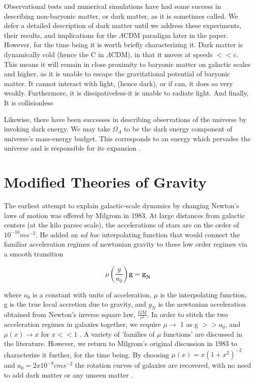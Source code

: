 \documentclass[12pt]{article}
\begin{document}
Observational tests and numerical simulations have had some success in describing non-baryonic matter, or dark matter, as it is sometimes called. We defer a detailed description of dark matter until we address these experiments, their results, and implications for the $\Lambda$CDM paradigm later in the paper. However, for the time being it is worth briefly characterizing it. Dark matter is dynamically cold (hence the C in $\Lambda$CDM), in that it moves at speeds $<< $c. This means it will remain in close proximity to baryonic matter on galactic scales and higher, as it is unable to escape the gravitational potential of baryonic matter. It cannot interact with light, (hence dark), or if can, it does so very weakly. Furthermore, it is dissipativeless-it is unable to radiate light. And finally, It is collisionless \cite{Famaey2012}

Likewise, there have been successes in describing observations of the universe by invoking dark energy. We may take $\Omega_{\Lambda}$ to be the dark energy component of universe's mass-energy budget. This corresponds to an energy which pervades the universe and is responsible for its expansion \cite{scott2002}.

\section{Modified Theories of Gravity}

The earliest attempt to explain galactic-scale dynamics by changing Newton's laws of motion was offered by Milgrom in 1983. At large distances from galactic centers (at the kilo parsec scale), the accelerations of stars are on the order of $10^{-10}ms^{-2}$. He added an \emph{ad hoc} interpolating function that would connect the familiar acceleration regimes of newtonian gravity to these low order regimes via a smooth transition \cite{MilgromI1983}

$$ \mu (\frac{g}{a_{0}}) \mathbf{g} =\mathbf{ g_{N}} $$

where $a_{0}$ is a constant with units of acceleration, $\mu$ is the interpolating function, g is the true local accretion due to gravity, and $g_{N}$ is the newtonian acceleration obtained from Newton's inverse square law, $\frac{GM}{r^2}$. In order to stitch the two acceleration regimes in galaxies together, we require $\mu \rightarrow $ 1 as g $ >> a_{0}$, and $\mu(x) \rightarrow x$ for $x << 1$ \cite{Famaey2012}. A variety of 'families of $\mu$ functions' are discussed in the literature. However, we return to Milgrom's original discussion in 1983 to characterize it further, for the time being. By choosing $\mu(x) = x(1+x^{2})^{-2}$ and $a_{0}= 2 x 10^{-8} cms^{-2}$ the rotation curves of galaxies are recovered, with no need to add dark matter or any unseen matter \cite{MilgromII1983}.
\end{document}
